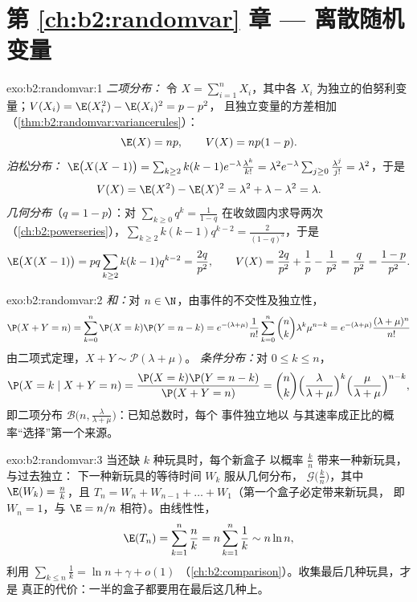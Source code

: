 \section*{第 \ref{ch:b2:randomvar} 章 --- 离散随机变量}

\begin{solution}{exo:b2:randomvar:1}
\emph{二项分布：} 令 $X = \sum_{i=1}^n X_i$，其中各
$X_i$ 为独立的伯努利变量；$V(X_i) = \E(X_i^2) - \E(X_i)^2 = p - p^2$，
且独立变量的方差相加
（\cref{thm:b2:randomvar:variancerules}）：
\[
\E(X) = np, \qquad V(X) = np(1-p) .
\]
\emph{泊松分布：} $\E\bigl(X(X-1)\bigr) =
\sum_{k\geq2}k(k-1)e^{-\lambda}\frac{\lambda^k}{k!} = \lambda^2
e^{-\lambda}\sum_{j\geq0}\frac{\lambda^j}{j!} = \lambda^2$，于是
\[
V(X) = \E(X^2) - \E(X)^2
= \lambda^2 + \lambda - \lambda^2 = \lambda .
\]
\emph{几何分布}（$q = 1 - p$）：对
$\sum_{k\geq0}q^k = \frac{1}{1-q}$ 在收敛圆内求导两次
（\cref{ch:b2:powerseries}），$\sum_{k\geq2}k(k-1)q^{k-2} =
\frac{2}{(1-q)^3}$，于是
\[
\E\bigl(X(X-1)\bigr) = pq\sum_{k\geq2}k(k-1)q^{k-2}
= \frac{2q}{p^2},
\qquad
V(X) = \frac{2q}{p^2} + \frac1p - \frac{1}{p^2}
= \frac{q}{p^2} = \frac{1-p}{p^2} .
\]
\end{solution}

\begin{solution}{exo:b2:randomvar:2}
\emph{和：}对 $n \in \N$，由事件的不交性及独立性，
\[
\P(X + Y = n)
= \sum_{k=0}^n \P(X = k)\P(Y = n - k)
= e^{-(\lambda + \mu)}\frac{1}{n!}
\sum_{k=0}^n \binom nk \lambda^k\mu^{n-k}
= e^{-(\lambda+\mu)}\frac{(\lambda + \mu)^n}{n!}
\]
由二项式定理，$X + Y \sim \mathcal{P}(\lambda + \mu)$。
\emph{条件分布：}对 $0 \leq k \leq n$，
\[
\P(X = k \mid X + Y = n)
= \frac{\P(X = k)\P(Y = n - k)}{\P(X + Y = n)}
= \binom nk
\Bigl(\frac{\lambda}{\lambda+\mu}\Bigr)^{k}
\Bigl(\frac{\mu}{\lambda+\mu}\Bigr)^{n-k} ,
\]
即二项分布 $\mathcal{B}\bigl(n,
\frac{\lambda}{\lambda+\mu}\bigr)$：已知总数时，每个
事件独立地以
与其速率成正比的概率“选择”第一个来源。
\end{solution}

\begin{solution}{exo:b2:randomvar:3}
当还缺 $k$ 种玩具时，每个新盒子
以概率 $\frac kn$ 带来一种新玩具，与过去独立：
下一种新玩具的等待时间 $W_k$ 服从几何分布，
$\mathcal{G}\bigl(\frac kn\bigr)$，其中 $\E(W_k) = \frac nk$，且
$T_n = W_n + W_{n-1} + \dots + W_1$（第一个盒子必定带来新玩具，
即 $W_n = 1$，与 $\E = n/n$ 相符）。由线性性，
\[
\E(T_n) = \sum_{k=1}^n \frac nk = n\sum_{k=1}^n\frac1k
\sim n\ln n ,
\]
利用 $\sum_{k\leq n}\frac1k = \ln n + \gamma + o(1)$
（\cref{ch:b2:comparison}）。收集最后几种玩具，才是
真正的代价：一半的盒子都要用在最后这几种上。
\end{solution}

